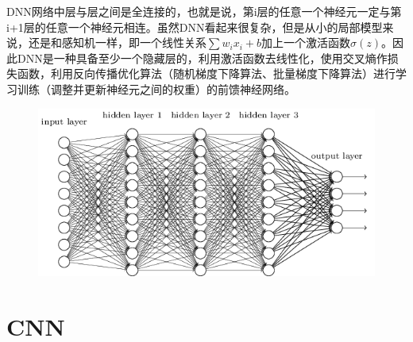 \documentclass{progbookcn}
\begin{document}
 DNN网络中层与层之间是全连接的，也就是说，第i层的任意一个神经元一定与第i+1层的任意一个神经元相连。虽然DNN看起来很复杂，但是从小的局部模型来说，还是和感知机一样，即一个线性关系$\sum{w_ix_i}+b$加上一个激活函数$\sigma(z)$。因此DNN是一种具备至少一个隐藏层的，利用激活函数去线性化，使用交叉熵作损失函数，利用反向传播优化算法（随机梯度下降算法、批量梯度下降算法）进行学习训练（调整并更新神经元之间的权重）的前馈神经网络。
 
 
 \begin{figure}[H]
  \centering
  \includegraphics[scale = 0.5]{dnn_show.png}
\end{figure}


\section{CNN}
\end{document}
